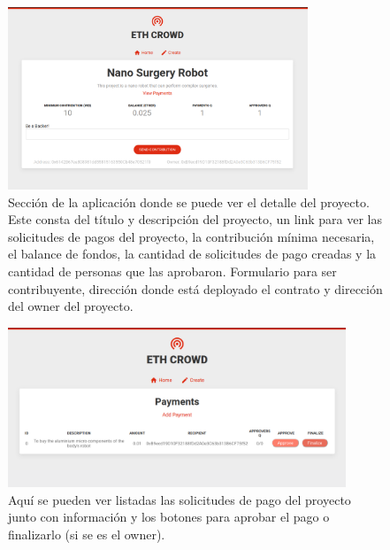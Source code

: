 \begin{figure}[H] 
\centering    
\includegraphics[width=0.8\textwidth]{project-detail}
\caption[project-detail]{Sección de la aplicación donde se puede ver el detalle del proyecto. Este consta del título y descripción del proyecto, un link para ver las solicitudes de pagos del proyecto, la contribución mínima necesaria, el balance de fondos, la cantidad de solicitudes de pago creadas y la cantidad de personas que las aprobaron. Formulario para ser contribuyente, dirección donde está deployado el contrato y dirección del owner del proyecto.}
\label{fig:project-detail}
\end{figure}

\begin{figure}[H] 
\centering    
\includegraphics[width=0.9\textwidth]{payments}
\caption[payments]{Aquí se pueden ver listadas las solicitudes de pago del proyecto junto con información y los botones para aprobar el pago o finalizarlo (si se es el owner).}
\label{fig:payments}
\end{figure}

